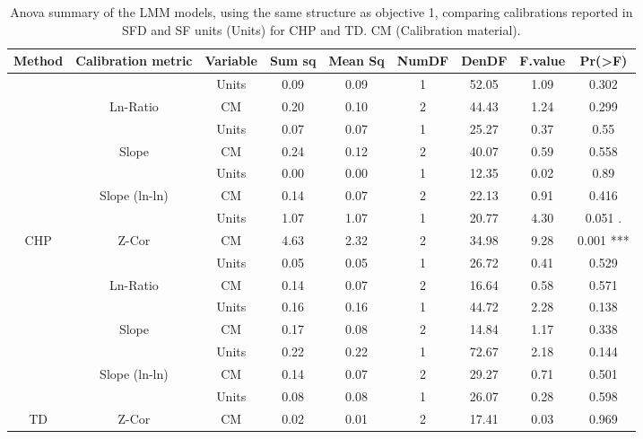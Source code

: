 \documentclass[11pt,twoside]{reedthesis}
\begin{document}
\begin{table}[!h]

\caption[Anova summary of the LMM models.]{\label{tab:unnamed-chunk-2}Anova summary of the LMM models, using the same structure as objective 1, comparing calibrations reported in SFD and SF units (Units) for CHP and TD. CM (Calibration material).}
\centering
\fontsize{6}{8}\selectfont
\begin{tabular}[t]{ccccccccc}
\toprule
Method & Calibration metric & Variable & Sum sq & Mean Sq & NumDF & DenDF & F.value & Pr(>F)\\
\midrule
 &  & Units & 0.09 & 0.09 & 1 & 52.05 & 1.09 & 0.302\\
\cmidrule{3-9}
 & \multirow[t]{-2}{*}{\centering\arraybackslash Ln-Ratio} & CM & 0.20 & 0.10 & 2 & 44.43 & 1.24 & 0.299\\
\cmidrule{2-9}
 &  & Units & 0.07 & 0.07 & 1 & 25.27 & 0.37 & 0.55\\
\cmidrule{3-9}
 & \multirow[t]{-2}{*}{\centering\arraybackslash Slope} & CM & 0.24 & 0.12 & 2 & 40.07 & 0.59 & 0.558\\
\cmidrule{2-9}
 &  & Units & 0.00 & 0.00 & 1 & 12.35 & 0.02 & 0.89\\
\cmidrule{3-9}
 & \multirow[t]{-2}{*}{\centering\arraybackslash Slope (ln-ln)} & CM & 0.14 & 0.07 & 2 & 22.13 & 0.91 & 0.416\\
\cmidrule{2-9}
 &  & Units & 1.07 & 1.07 & 1 & 20.77 & 4.30 & 0.051 .\\
\cmidrule{3-9}
\multirow[t]{-8}{*}{\centering\arraybackslash CHP} & \multirow[t]{-2}{*}{\centering\arraybackslash Z-Cor} & CM & 4.63 & 2.32 & 2 & 34.98 & 9.28 & 0.001 ***\\
\cmidrule{1-9}
 &  & Units & 0.05 & 0.05 & 1 & 26.72 & 0.41 & 0.529\\
\cmidrule{3-9}
 & \multirow[t]{-2}{*}{\centering\arraybackslash Ln-Ratio} & CM & 0.14 & 0.07 & 2 & 16.64 & 0.58 & 0.571\\
\cmidrule{2-9}
 &  & Units & 0.16 & 0.16 & 1 & 44.72 & 2.28 & 0.138\\
\cmidrule{3-9}
 & \multirow[t]{-2}{*}{\centering\arraybackslash Slope} & CM & 0.17 & 0.08 & 2 & 14.84 & 1.17 & 0.338\\
\cmidrule{2-9}
 &  & Units & 0.22 & 0.22 & 1 & 72.67 & 2.18 & 0.144\\
\cmidrule{3-9}
 & \multirow[t]{-2}{*}{\centering\arraybackslash Slope (ln-ln)} & CM & 0.14 & 0.07 & 2 & 29.27 & 0.71 & 0.501\\
\cmidrule{2-9}
 &  & Units & 0.08 & 0.08 & 1 & 26.07 & 0.28 & 0.598\\
\cmidrule{3-9}
\multirow[t]{-8}{*}{\centering\arraybackslash TD} & \multirow[t]{-2}{*}{\centering\arraybackslash Z-Cor} & CM & 0.02 & 0.01 & 2 & 17.41 & 0.03 & 0.969\\
\bottomrule
\end{tabular}
\end{table}
\end{document}
